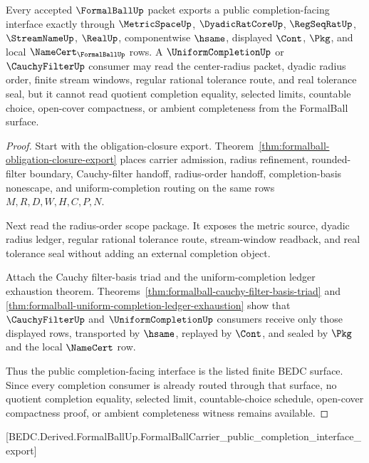 \begin{theorem}
\label{thm:formalball-public-completion-interface-export}
Every accepted $\FormalBallUp$ packet exports a public completion-facing interface exactly through $\MetricSpaceUp$, $\DyadicRatCoreUp$, $\RegSeqRatUp$, $\StreamNameUp$, $\RealUp$, componentwise $\hsame$, displayed $\Cont$, $\Pkg$, and local $\NameCert_{\FormalBallUp}$ rows. A $\UniformCompletionUp$ or $\CauchyFilterUp$ consumer may read the center-radius packet, dyadic radius order, finite stream windows, regular rational tolerance route, and real tolerance seal, but it cannot read quotient completion equality, selected limits, countable choice, open-cover compactness, or ambient completeness from the FormalBall surface.
\end{theorem}
\begin{proof}
Start with the obligation-closure export. Theorem~\ref{thm:formalball-obligation-closure-export} places carrier admission, radius refinement, rounded-filter boundary, Cauchy-filter handoff, radius-order handoff, completion-basis nonescape, and uniform-completion routing on the same rows $M,R,D,W,H,C,P,N$.

Next read the radius-order scope package. It exposes the metric source, dyadic radius ledger, regular rational tolerance route, stream-window readback, and real tolerance seal without adding an external completion object.

Attach the Cauchy filter-basis triad and the uniform-completion ledger exhaustion theorem. Theorems~\ref{thm:formalball-cauchy-filter-basis-triad} and \ref{thm:formalball-uniform-completion-ledger-exhaustion} show that $\CauchyFilterUp$ and $\UniformCompletionUp$ consumers receive only those displayed rows, transported by $\hsame$, replayed by $\Cont$, and sealed by $\Pkg$ and the local $\NameCert$ row.

Thus the public completion-facing interface is the listed finite BEDC surface. Since every completion consumer is already routed through that surface, no quotient completion equality, selected limit, countable-choice schedule, open-cover compactness proof, or ambient completeness witness remains available.
\end{proof}

[BEDC.Derived.FormalBallUp.FormalBallCarrier\_public\_completion\_interface\_export]

